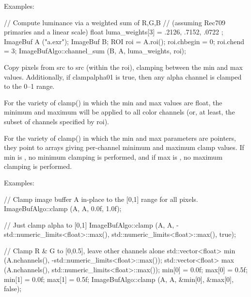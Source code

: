\smallskip
\noindent Examples:
\begin{code}
    // Compute luminance via a weighted sum of R,G,B
    // (assuming Rec709 primaries and a linear scale)
    float luma_weights[3] = { .2126, .7152, .0722 };
    ImageBuf A ("a.exr");
    ImageBuf B;
    ROI roi = A.roi();
    roi.chbegin = 0;  roi.chend = 3;
    ImageBufAlgo::channel_sum (B, A, luma_weights, roi);
\end{code}
\apiend


 

Copy pixels from {\cf src} to {\cf src} (within the {\cf roi}), clamping
between the {\cf min} and {\cf max} values.  Additionally, if
{\cf clampalpha01} is {\cf true}, then any alpha 
channel is clamped to the 0--1 range.

For the variety of {\cf clamp()} in which the {\cf min} and {\cf max}
values are {\cf float}, the minimum and maximum will be applied to
all color channels (or, at least, the subset of channels specified by
{\cf roi}).

For the variety of {\cf clamp()} in which the {\cf min} and {\cf max}
parameters are pointers, they point to arrays giving per-channel minimum
and maximum clamp values.  If {\cf min} is \NULL, no minimum clamping is
performed, and if {\cf max} is \NULL, no maximum clamping is performed.

\smallskip
\noindent Examples:
\begin{code}
    // Clamp image buffer A in-place to the [0,1] range for all pixels.
    ImageBufAlgo::clamp (A, A, 0.0f, 1.0f);

    // Just clamp alpha to [0,1]
    ImageBufAlgo::clamp (A, A, -std::numeric_limits<float>::max(),
                         std::numeric_limits<float>::max(), true);

    // Clamp R & G to [0,0.5], leave other channels alone
    std::vector<float> min (A.nchannels(), -std::numeric_limits<float>::max());
    std::vector<float> max (A.nchannels(), std::numeric_limits<float>::max());
    min[0] = 0.0f;  max[0] = 0.5f;
    min[1] = 0.0f;  max[1] = 0.5f;
    ImageBufAlgo::clamp (A, A, &min[0], &max[0], false);
\end{code}
\apiend


